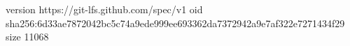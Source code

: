 version https://git-lfs.github.com/spec/v1
oid sha256:6d33ae7872042bc5c74a9ede999ee693362da7372942a9e7af322e7271434f29
size 11068
